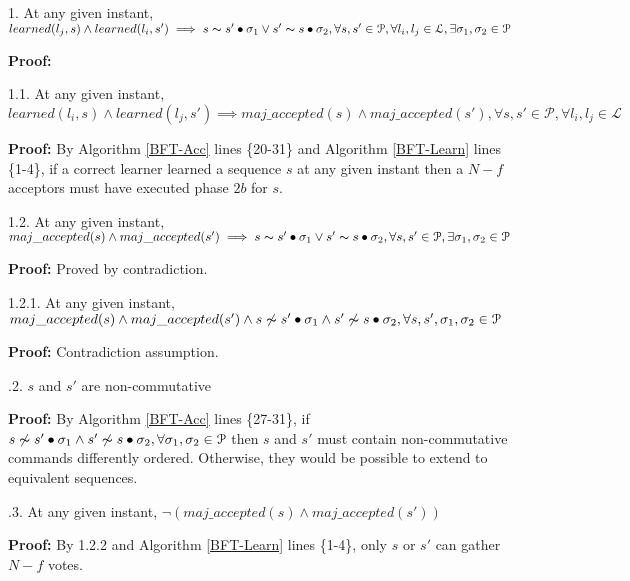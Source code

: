 \parbox{\linewidth}{1. At any given instant, $learned(l_j,s) \land learned(l_i,s') \implies s \thicksim s' \bullet \sigma_1 \lor s' \thicksim s \bullet \sigma_2, \forall s,s' \in \mathcal{P}, \forall l_i,l_j \in \mathcal{L}, \exists \sigma_1,\sigma_2 \in \mathcal{P}$}  \par
\indent\indent\textbf{Proof:} \par
\indent\indent\indent\parbox{\linewidth}{1.1. At any given instant, $learned(l_i,s) \land learned(l_j,s') \implies maj\_accepted(s) \land maj\_accepted(s'), \forall s,s' \in \mathcal{P}, \forall l_i,l_j \in \mathcal{L}$ } \par
\indent\indent\indent\indent\parbox{\linewidth}{\textbf{Proof:} By Algorithm \ref{BFT-Acc} lines \{20-31\} and Algorithm \ref{BFT-Learn} lines \{1-4\}, if a correct learner learned a sequence $s$ at any given instant then a $N-f$ acceptors must have executed phase $2b$ for $s$.}\par
\indent\indent\indent\parbox{\linewidth}{1.2. At any given instant, $maj\_accepted(s) \land maj\_accepted(s') \implies s \thicksim s' \bullet \sigma_1 \lor s' \thicksim s \bullet \sigma_2, \forall s,s' \in \mathcal{P}, \exists \sigma_1,\sigma_2 \in \mathcal{P}$}\par
\indent\indent\indent\indent\textbf{Proof:} Proved by contradiction.\par
\indent\indent\indent\indent\indent\parbox{\linewidth}{1.2.1. At any given instant, $maj\_accepted(s) \land maj\_accepted(s') \wedge s \not\thicksim s' \bullet \sigma_1 \land s' \not\thicksim s \bullet \sigma_2, \forall s,s',\sigma_1,\sigma_2 \in \mathcal{P}$} \par
\indent\indent\indent\indent\indent\indent\textbf{Proof:} Contradiction assumption.\par
\indent\indent\indent\indent{}.2. $s$ and $s'$ are non-commutative \par
\indent\indent\indent\indent\indent\indent \parbox{\linewidth}{\textbf{Proof:} By Algorithm \ref{BFT-Acc} lines \{27-31\}, if $s \not\thicksim s' \bullet \sigma_1 \land s' \not\thicksim s \bullet \sigma_2, \forall \sigma_1,\sigma_2 \in \mathcal{P}$ then $s$ and $s'$ must contain non-commutative commands differently ordered. Otherwise, they would be possible to extend to equivalent sequences.}\par
\indent\indent\indent\indent{}.3. At any given instant, $\neg (maj\_accepted(s) \land maj\_accepted(s'))$ \par
\indent\indent\indent\indent\indent\indent \parbox{\linewidth}{\textbf{Proof:} By 1.2.2 and Algorithm \ref{BFT-Learn} lines \{1-4\}, only $s$ or $s'$ can gather $N-f$ votes.}\par
